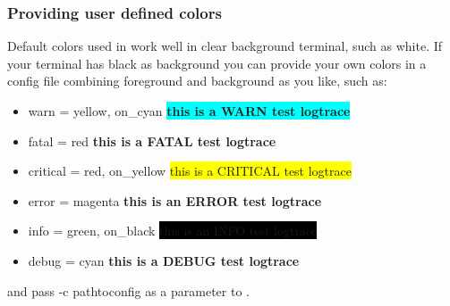 
\subsubsection{Providing user defined colors}
Default colors used in \logftailer{} work well in clear background terminal,
such as white. If your terminal has black as background you can provide your own
colors in a config file combining foreground and background as you like, such as:
\begin{itemize}
 \item warn = yellow, on\_cyan \colorbox{cyan}{\color{yellow}\textbf{this is a WARN test logtrace}}
 \item fatal = red {\color{red}\textbf{this is a FATAL test logtrace}}
 \item critical = red, on\_yellow \colorbox{yellow}{\color{red}this is a CRITICAL test logtrace}
 \item error = magenta {\color{magenta}\textbf{this is an ERROR test logtrace}}
 \item info = green, on\_black \colorbox{black}{\color{green}this is an INFO test logtrace}
 \item debug = cyan {\color{cyan}\textbf{this is a DEBUG test logtrace}}
\end{itemize}
and pass -c pathtoconfig as a parameter to \logftailer{}. 

